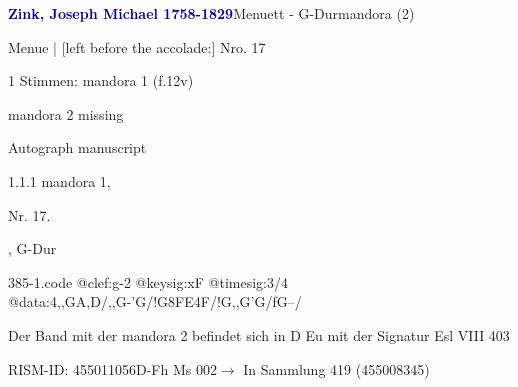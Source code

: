 \documentclass[twocolumn]{book}
\begin{document}
\par \vspace{7pt} \textcolor{darkblue}{\textbf{Zink, Joseph Michael  1758-1829}}\hfillplus{\textbf{[385]}}\newline Menuett - G-Dur\newline mandora (2)
\par \begin{itshape}[f.12v, at left:] Menue | [left before the accolade:] Nro. 17\end{itshape} 
\par \textcolor{darkblue}{}  1 Stimmen: mandora 1  (f.12v)\newline \begin{small} mandora 2 missing\end{small} \newline Autograph manuscript
\par 1.1.1  mandora 1, \begin{itshape}Nr. 17.\end{itshape}, G-Dur  
\begin{filecontents*}{385-1.code}
@clef:g-2
@keysig:xF
@timesig:3/4
@data:4,,GA,D/,,G-'G/!G{8FE}4F/!G,,G'G/fG--/
\end{filecontents*}
\newline
%
\par Der Band mit der mandora 2 befindet sich in D Eu mit der Signatur Esl VIII 403
\par RISM-ID: 455011056\newline D-Fh  Ms 002\newline $\rightarrow$ In Sammlung 419 (455008345)
      
\end{document}
